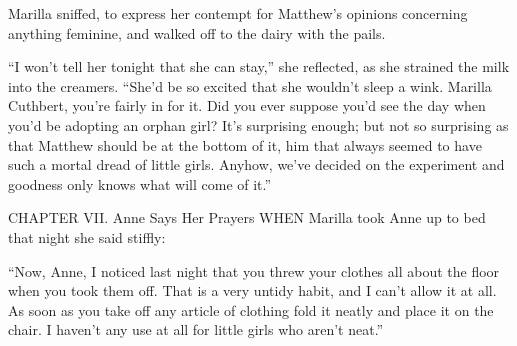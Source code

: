 \documentclass[a4paper]{article}
\begin{document}
Marilla sniffed, to express her contempt for Matthew's opinions concerning anything feminine, and walked off to the dairy with the pails.

``I won't tell her tonight that she can stay,'' she reflected, as she strained the milk into the creamers. ``She'd be so excited that she wouldn't sleep a wink. Marilla Cuthbert, you're fairly in for it. Did you ever suppose you'd see the day when you'd be adopting an orphan girl? It's surprising enough; but not so surprising as that Matthew should be at the bottom of it, him that always seemed to have such a mortal dread of little girls. Anyhow, we've decided on the experiment and goodness only knows what will come of it.''

CHAPTER VII.
Anne Says Her Prayers
WHEN Marilla took Anne up to bed that night she said stiffly:

``Now, Anne, I noticed last night that you threw your clothes all about the floor when you took them off. That is a very untidy habit, and I can't allow it at all. As soon as you take off any article of clothing fold it neatly and place it on the chair. I haven't any use at all for little girls who aren't neat.''
\end{document}
